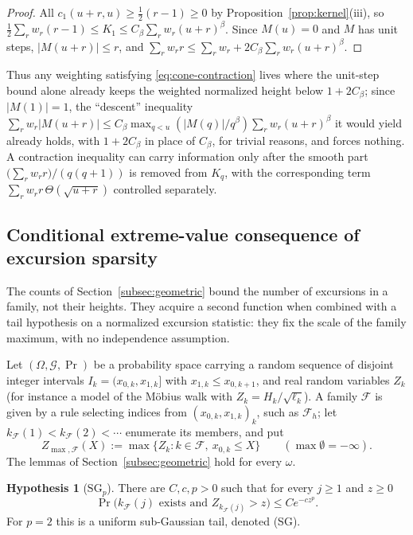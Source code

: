 \documentclass[11pt]{amsart}
\numberwithin{equation}{section}
\theoremstyle{plain}
\theoremstyle{definition}
\newtheorem{hypothesis}[theorem]{Hypothesis}
\theoremstyle{remark}
\newcommand{\F}{\mathcal{F}}
\begin{document}
\begin{proof}
All $c_1(u+r,u)\ge\frac12(r-1)\ge0$ by Proposition~\ref{prop:kernel}(iii),
so $\frac12\sum_rw_r(r-1)\le K_1\le C_\beta\sum_rw_r(u+r)^\beta$. Since
$M(u)=0$ and $M$ has unit steps, $|M(u+r)|\le r$, and
$\sum_rw_rr\le\sum_rw_r+2C_\beta\sum_rw_r(u+r)^\beta$.
\end{proof}

Thus any weighting satisfying \eqref{eq:cone-contraction} lives where the
unit-step bound alone already keeps the weighted normalized height below
$1+2C_\beta$; since $|M(1)|=1$, the ``descent'' inequality
$\sum_rw_r|M(u+r)|\le C_\beta\max_{q<u}(|M(q)|/q^\beta)\sum_rw_r(u+r)^\beta$
it would yield already holds, with $1+2C_\beta$ in place of $C_\beta$, for
trivial reasons, and forces nothing. A contraction
inequality can carry information only after the smooth part
$\bigl(\sum_rw_rr\bigr)/(q(q+1))$ is removed from $K_q$, with the
corresponding term $\sum_rw_rr\,\Theta(\sqrt{u+r})$ controlled separately.

\subsection{Conditional extreme-value consequence of excursion sparsity}
\label{subsec:extreme}

The counts of Section~\ref{subsec:geometric} bound the number of excursions
in a family, not their heights. They acquire a second function when combined
with a tail hypothesis on a normalized excursion statistic: they fix the
scale of the family maximum, with no independence assumption.

Let $(\Omega,\mathcal G,\Pr)$ be a probability space carrying a random
sequence of disjoint integer intervals $I_k=(x_{0,k},x_{1,k}]$ with
$x_{1,k}\le x_{0,k+1}$, and real random variables $Z_k$ (for instance a model
of the M\"obius walk with $Z_k=H_k/\sqrt{\ell_k}$). A family $\F$ is given by
a rule selecting indices from $(x_{0,k},x_{1,k})_k$, such as $\F_h$; let
$k_\F(1)<k_\F(2)<\cdots$ enumerate its members, and put
\[
Z_{\max,\F}(X):=\max\{Z_k:k\in\F,\ x_{0,k}\le X\}\qquad(\max\emptyset=-\infty).
\]
The lemmas of Section~\ref{subsec:geometric} hold for every $\omega$.

\begin{hypothesis}[$\mathrm{SG}_p$]
\label{hyp:SG}
There are $C,c,p>0$ such that for every $j\ge1$ and $z\ge0$
\[
\Pr\bigl(k_\F(j)\text{ exists and }Z_{k_\F(j)}>z\bigr)\le Ce^{-cz^p}.
\]
For $p=2$ this is a uniform sub-Gaussian tail, denoted (SG).
\end{hypothesis}
\end{document}

